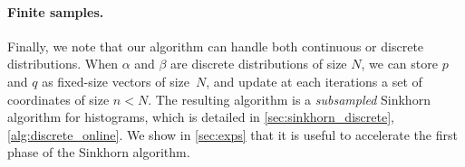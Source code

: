 \paragraph{Finite samples.}Finally, we note that our algorithm
can handle both continuous or discrete distributions. When $\alpha$ and $\beta$
are discrete distributions of size $N$, we can store $p$ and $q$ as fixed-size
vectors of size~$N$, and update at each iterations a set of coordinates of size $n < N$. The resulting
algorithm is a \textit{subsampled} Sinkhorn algorithm for histograms, which is
detailed in \autoref{sec:sinkhorn_discrete}, \autoref{alg:discrete_online}. We show in \autoref{sec:exps} that it
is useful to accelerate the first phase of the Sinkhorn algorithm.